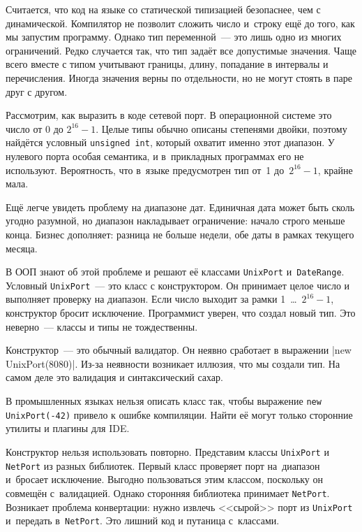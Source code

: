 
Считается, что код на языке со статической типизацией безопаснее, чем с
динамической. Компилятор не позволит сложить число и~строку ещё до того, как
мы запустим программу. Однако тип переменной~--- это лишь одно из многих
ограничений. Редко случается так, что тип задаёт все допустимые
значения. Чаще всего вместе с типом учитывают границы, длину, попадание в
интервалы и перечисления. Иногда значения верны по отдельности, но не могут
стоять в паре друг с другом.


Рассмотрим, как выразить в коде сетевой порт. В операционной системе это число
от 0 до $2^{16}-1$. Целые типы обычно описаны степенями двойки, поэтому найдётся
условный \verb|unsigned int|, который охватит именно этот диапазон. У нулевого
порта особая семантика, и в~прикладных программах его не используют.
Вероятность, что в~языке предусмотрен тип от~1 до~$2^{16}-1$, крайне мала.

Ещё легче увидеть проблему на диапазоне дат. Единичная дата может быть сколь
угодно разумной, но диапазон накладывает ограничение: начало строго меньше
конца. Бизнес дополняет: разница не больше недели, обе даты в рамках текущего
месяца.


В ООП знают об этой проблеме и решают её классами \verb|UnixPort|
и~\verb|DateRange|. Условный \verb|UnixPort|~--- это класс с конструктором. Он
принимает целое число и выполняет проверку на диапазон. Если число выходит за
рамки 1~\dots~$2^{16}-1$, конструктор бросит исключение. Программист уверен, что
создал новый тип. Это неверно~--- классы и типы не тождественны.

Конструктор~--- это обычный валидатор. Он неявно сработает в выражении
\spverb|new UnixPort(8080)|. Из-за неявности возникает иллюзия, что мы создали
тип. На самом деле это валидация и синтаксический сахар.


В промышленных языках нельзя описать класс так, чтобы выражение
\verb|new UnixPort(-42)| привело к ошибке компиляции. Найти её могут
только сторонние утилиты и плагины для IDE.

Конструктор нельзя использовать повторно. Представим классы \verb|UnixPort| и
\verb|NetPort| из разных библиотек. Первый класс проверяет порт на~диапазон
и~бросает исключение. Выгодно пользоваться этим классом, поскольку он совмещён
с~валидацией. Однако сторонняя библиотека принимает \verb|NetPort|. Возникает
проблема конвертации: нужно извлечь <<сырой>> порт из \verb|UnixPort| и~передать
в~\verb|NetPort|. Это лишний код и путаница с~классами.

